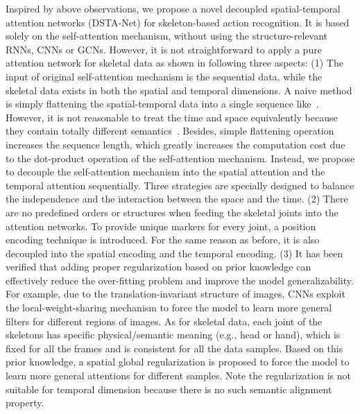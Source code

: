 \documentclass[runningheads]{llncs}
\begin{document}
Inspired by above observations, we propose a novel decoupled spatial-temporal attention networks (DSTA-Net) for skeleton-based action recognition. 
It is based solely on the self-attention mechanism, without using the structure-relevant RNNs, CNNs or GCNs. 
However, it is not straightforward to apply a pure attention network for skeletal data as shown in following three aspects: 
(1) The input of original self-attention mechanism is the sequential data, while the skeletal data exists in both the spatial and temporal dimensions. 
A naive method is simply flattening the spatial-temporal data into a single sequence like~\cite{wang_non-local_2018}. 
However, it is not reasonable to treat the time and space equivalently because they contain totally different semantics~\cite{feichtenhofer_slowfast_2019}. 
Besides, simple flattening operation increases the sequence length, which greatly increases the computation cost due to the dot-product operation of the self-attention mechanism. 
Instead, we propose to decouple the self-attention mechanism into the spatial attention and the temporal attention sequentially.
Three strategies are specially designed to balance the independence and the interaction between the space and the time. 
(2) There are no predefined orders or structures when feeding the skeletal joints into the attention networks. 
To provide unique markers for every joint, a position encoding technique is introduced. 
For the same reason as before, it is also decoupled into the spatial encoding and the temporal encoding.
(3) 
It has been verified that adding proper regularization based on prior knowledge can effectively reduce the over-fitting problem and improve the model generalizability. 
For example, due to the translation-invariant structure of images, CNNs exploit the local-weight-sharing mechanism to force the model to learn more general filters for different regions of images. 
As for skeletal data, each joint of the skeletons has specific physical/semantic meaning (e.g., head or hand), which is fixed for all the frames and is consistent for all the data samples. 
Based on this prior knowledge, a spatial global regularization is proposed to force the model to learn more general attentions for different samples. 
Note the regularization is not suitable for temporal dimension because there is no such semantic alignment property. 
\end{document}
